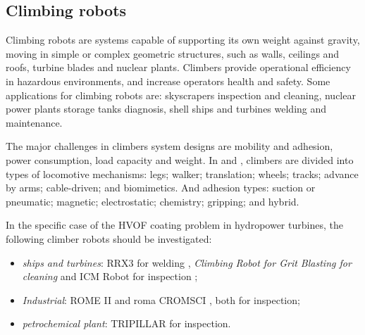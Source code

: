 \subsection{Climbing robots}\label{sota_climbers}
Climbing robots are systems capable of supporting its own weight against
gravity, moving in simple or complex geometric structures, such as
walls, ceilings and roofs, turbine blades and nuclear plants.
Climbers provide operational efficiency in hazardous environments, and increase
operators health and safety. Some applications for climbing robots are:
skyscrapers inspection and cleaning, nuclear power
plants storage tanks diagnosis, shell ships and turbines welding and
maintenance\citep{armada2003application}.

The major challenges in climbers system designs are mobility and
adhesion, power consumption, load capacity and weight. In
\cite{modular} and \cite{climbsurv}, climbers are divided into types of
locomotive mechanisms: legs; walker; translation; wheels; tracks;
advance by arms; cable-driven; and biomimetics. And adhesion types:
suction or pneumatic; magnetic; electrostatic; chemistry; gripping; and hybrid.

In the specific case of the HVOF coating problem in hydropower turbines, the
following climber robots should be investigated:

\begin{itemize}
  \item \emph {ships and turbines}: RRX3 for welding
   \citep{rrx3}, \emph{Climbing Robot for Grit Blasting for cleaning}
   \citep{crgb} and ICM Robot for inspection \citep{icm};
  \item \emph{Industrial}: ROME II \citep{roma} and roma
   CROMSCI \citep{CROMSCI}, both for inspection;
  \item \emph{petrochemical plant}: TRIPILLAR \citep{tripillar} for inspection.
\end{itemize}

